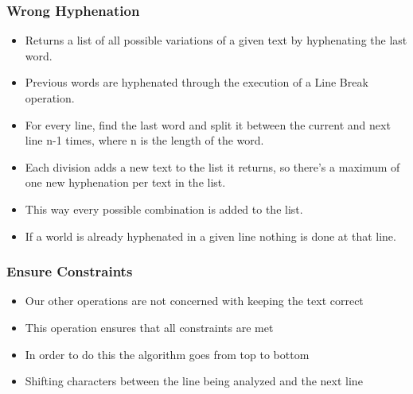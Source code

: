 \documentclass{beamer}
\begin{document}
\begin{frame}



\end{frame}


\begin{frame}
\frametitle{Wrong Hyphenation}
\begin{itemize}
\item Returns a list of all possible variations of a given text by hyphenating the last word.
\item Previous words are hyphenated through the execution of a Line Break operation.
\item For every line, find the last word and split it between the current and next line n-1 times, where n is the length of the word. 
\item Each division adds a new text to the list it returns, so there's a maximum of one new hyphenation per text in the list.
\item This way every possible combination is added to the list.
\item If a world is already hyphenated in a given line nothing is done at that line.
\end{itemize}
\end{frame}

\begin{frame}
\frametitle{Ensure Constraints}
\begin{itemize}
\item Our other operations are not concerned with keeping the text correct
\item This operation ensures that all constraints are met
\item In order to do this the algorithm goes from top to bottom
\item Shifting characters between the line being analyzed and the next line
	
\end{itemize}	
\end{frame}
\end{document}
